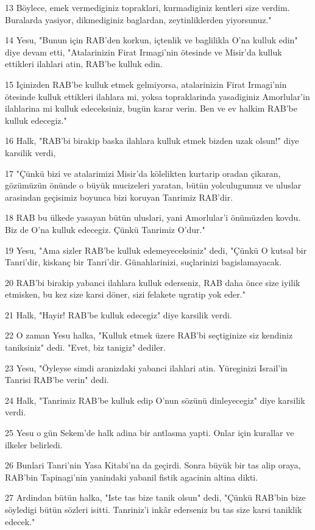 \par 13 Böylece, emek vermediginiz topraklari, kurmadiginiz kentleri size verdim. Buralarda yasiyor, dikmediginiz baglardan, zeytinliklerden yiyorsunuz."
\par 14 Yesu, "Bunun için RAB'den korkun, içtenlik ve baglilikla O'na kulluk edin" diye devam etti, "Atalarinizin Firat Irmagi'nin ötesinde ve Misir'da kulluk ettikleri ilahlari atin, RAB'be kulluk edin.
\par 15 Içinizden RAB'be kulluk etmek gelmiyorsa, atalarinizin Firat Irmagi'nin ötesinde kulluk ettikleri ilahlara mi, yoksa topraklarinda yasadiginiz Amorlular'in ilahlarina mi kulluk edeceksiniz, bugün karar verin. Ben ve ev halkim RAB'be kulluk edecegiz."
\par 16 Halk, "RAB'bi birakip baska ilahlara kulluk etmek bizden uzak olsun!" diye karsilik verdi,
\par 17 "Çünkü bizi ve atalarimizi Misir'da kölelikten kurtarip oradan çikaran, gözümüzün önünde o büyük mucizeleri yaratan, bütün yolculugumuz ve uluslar arasindan geçisimiz boyunca bizi koruyan Tanrimiz RAB'dir.
\par 18 RAB bu ülkede yasayan bütün uluslari, yani Amorlular'i önümüzden kovdu. Biz de O'na kulluk edecegiz. Çünkü Tanrimiz O'dur."
\par 19 Yesu, "Ama sizler RAB'be kulluk edemeyeceksiniz" dedi, "Çünkü O kutsal bir Tanri'dir, kiskanç bir Tanri'dir. Günahlarinizi, suçlarinizi bagislamayacak.
\par 20 RAB'bi birakip yabanci ilahlara kulluk ederseniz, RAB daha önce size iyilik etmisken, bu kez size karsi döner, sizi felakete ugratip yok eder."
\par 21 Halk, "Hayir! RAB'be kulluk edecegiz" diye karsilik verdi.
\par 22 O zaman Yesu halka, "Kulluk etmek üzere RAB'bi seçtiginize siz kendiniz taniksiniz" dedi. "Evet, biz tanigiz" dediler.
\par 23 Yesu, "Öyleyse simdi aranizdaki yabanci ilahlari atin. Yüreginizi Israil'in Tanrisi RAB'be verin" dedi.
\par 24 Halk, "Tanrimiz RAB'be kulluk edip O'nun sözünü dinleyecegiz" diye karsilik verdi.
\par 25 Yesu o gün Sekem'de halk adina bir antlasma yapti. Onlar için kurallar ve ilkeler belirledi.
\par 26 Bunlari Tanri'nin Yasa Kitabi'na da geçirdi. Sonra büyük bir tas alip oraya, RAB'bin Tapinagi'nin yanindaki yabanil fistik agacinin altina dikti.
\par 27 Ardindan bütün halka, "Iste tas bize tanik olsun" dedi, "Çünkü RAB'bin bize söyledigi bütün sözleri isitti. Tanriniz'i inkâr ederseniz bu tas size karsi taniklik edecek."
